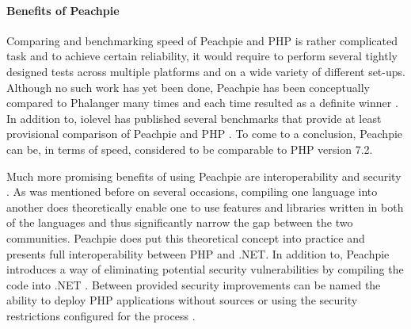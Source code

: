 \paragraph{Benefits of Peachpie}
Comparing and benchmarking speed of Peachpie and PHP is rather complicated task and to achieve certain reliability, it would require to perform several tightly designed tests across multiple platforms and on a wide variety of different set-ups. Although no such work has yet been done, Peachpie has been conceptually compared to Phalanger many times and each time resulted as a definite winner \citep{Peachpie}. In addition to, iolevel has published several benchmarks that provide at least provisional comparison of Peachpie and PHP \citep{Peachpie}. To come to a conclusion, Peachpie can be, in terms of speed, considered to be comparable to PHP version 7.2.

Much more promising benefits of using Peachpie are interoperability and security \citep{Peachpie}. As was mentioned before on several occasions, compiling one language into another does theoretically enable one to use features and libraries written in both of the languages and thus significantly narrow the gap between the two communities. Peachpie does put this theoretical concept into practice and presents full interoperability between PHP and .NET. In addition to, Peachpie introduces a way of eliminating potential security vulnerabilities by compiling the code into .NET \citep{Peachpie}. Between provided security improvements can be named the ability to deploy PHP applications without sources or using the security restrictions configured for the process \citep{Peachpie}.




